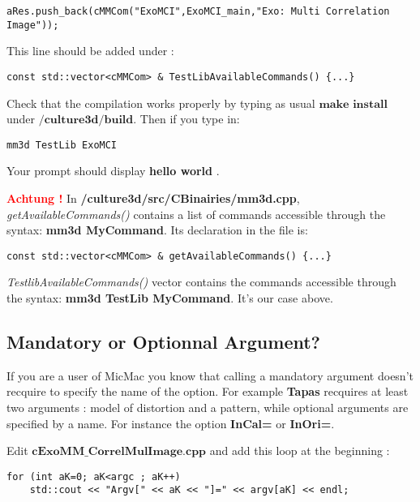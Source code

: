 \begin{verbatim}
aRes.push_back(cMMCom("ExoMCI",ExoMCI_main,"Exo: Multi Correlation Image"));
\end{verbatim}

This line should be added under : \newline
\begin{verbatim}
const std::vector<cMMCom> & TestLibAvailableCommands() {...}
\end{verbatim}

Check that the compilation works properly by typing as usual $\textbf{make install}$ under \og$\textbf{/culture3d/build}$\fg. Then if you type in:

\begin{verbatim}
mm3d TestLib ExoMCI
\end{verbatim}
Your prompt should display \og \textbf{hello world} \fg.\newline
 
 \textbf{\textcolor{red}{Achtung !}} In \textbf{/culture3d/src/CBinairies/mm3d.cpp},  \textit{getAvailableCommands()} contains a list of commands accessible through the syntax: \textbf{mm3d MyCommand}. Its declaration in the file is:
\begin{verbatim}
const std::vector<cMMCom> & getAvailableCommands() {...}
\end{verbatim}

\textit{TestlibAvailableCommands()} vector contains the commands accessible through the syntax: \textbf{mm3d TestLib MyCommand}. It's our case above.

\subsection{Mandatory or Optionnal Argument?}
If you are a user of MicMac you know that calling a mandatory argument doesn't recquire to specify the name of the option. For example \textbf{Tapas} recquires at least two arguments : model of distortion and a pattern, while optional arguments are specified by a name. For instance the option \textbf{InCal=} or \textbf{InOri=}.\newline


Edit $\textbf{cExoMM\_CorrelMulImage.cpp}$ and add this loop at the beginning :\newline

\begin{verbatim}
for (int aK=0; aK<argc ; aK++)
	std::cout << "Argv[" << aK << "]=" << argv[aK] << endl; 
\end{verbatim}

